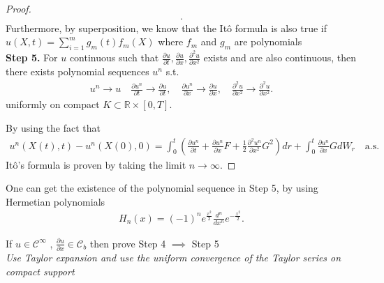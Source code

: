 \begin{proof}
\begin{align*}
  .\end{align*}
  Furthermore, by superposition, we know that the It\^o formula is also true if $u(X,t) = \sum_{i=1}^{m} g_m(t)f_m(X) $ where $f_m$ and $g_m$ are polynomials\\[1ex]
  \vskip3mm
  \textbf{Step 5.} For $u$ continuous such that $\frac{\partial u}{\partial t} , \frac{\partial u}{\partial x} ,\frac{\partial ^2 u}{\partial x^2}$ exists and are also continuous, then
  there exists polynomial sequences $u^{n} $ s.t.
  \begin{align*}
    u^{n} \to  u \quad \frac{\partial u^{n } }{\partial t} \to \frac{\partial u}{\partial t} , \quad \frac{\partial u^{n } }{\partial x} \to \frac{\partial u}{\partial x} , \quad \frac{\partial ^2 u}{\partial x^2} \to \frac{\partial ^2 u}{\partial x^2} 
  .\end{align*}
  uniformly on compact $K \subset  \mathbb{R}\times [0,T]$.

  By using the fact that 
  \begin{align*}
    u^{n}(X(t),t) -u^{n}(X(0),0)  = \int_0^{t} \left( \frac{\partial u^{n } }{\partial t} +\frac{\partial u^{n } }{\partial x} F + \frac{1}{2} \frac{\partial ^2 u^{n} }{\partial x^2} G^2  \right)  dr + \int_0^{t} \frac{\partial u^{n } }{\partial x}  GdW_r \quad \text{a.s.} 
 \end{align*}
 It\^o's formula is proven by taking the limit $n\to \infty$.
\end{proof}
\begin{remark}
 One can get the existence of the polynomial sequence in Step 5, by using Hermetian polynomials 
 \begin{align*}
  H_n(x) = (-1)^{n}  e^{\frac{x^2}{2}} \frac{d^{n}}{d x^{n} } e^{-\frac{x^2}{2}} 
 .\end{align*}
\end{remark}
\begin{exercise}
  If $u \in  \mathcal{C}^{\infty} $  , $\frac{\partial u}{\partial x} \in  \mathcal{C}_b$ then prove Step 4 $\implies$ Step 5 \\[1ex]
  \textit{Use Taylor expansion and use the uniform convergence of the Taylor series on compact support }
\end{exercise}
\newpage
